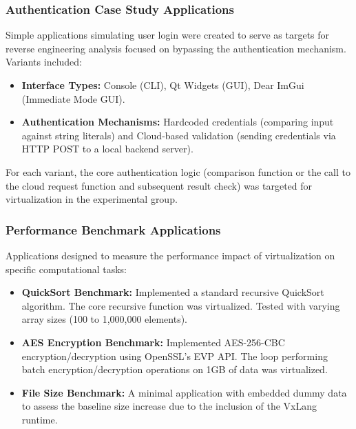 \subsubsection{Authentication Case Study Applications} Simple applications simulating user login were created to serve as targets for reverse engineering analysis focused on bypassing the authentication mechanism. Variants included:
    \begin{itemize}
        \item \textbf{Interface Types:} Console (CLI), Qt Widgets (GUI), Dear ImGui (Immediate Mode GUI).
        \item \textbf{Authentication Mechanisms:} Hardcoded credentials (comparing input against string literals) and Cloud-based validation (sending credentials via HTTP POST to a local backend server).
    \end{itemize}
    For each variant, the core authentication logic (comparison function or the call to the cloud request function and subsequent result check) was targeted for virtualization in the experimental group.

\subsubsection{Performance Benchmark Applications} Applications designed to measure the performance impact of virtualization on specific computational tasks:
    \begin{itemize}
        \item \textbf{QuickSort Benchmark:} Implemented a standard recursive QuickSort algorithm. The core recursive function was virtualized. Tested with varying array sizes (100 to 1,000,000 elements).
        \item \textbf{AES Encryption Benchmark:} Implemented AES-256-CBC encryption/decryption using OpenSSL's EVP API. The loop performing batch encryption/decryption operations on 1GB of data was virtualized.
        \item \textbf{File Size Benchmark:} A minimal application with embedded dummy data to assess the baseline size increase due to the inclusion of the VxLang runtime.
    \end{itemize}

